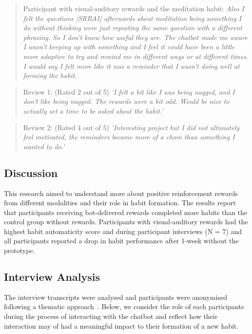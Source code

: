 \begin{quote}
Participant with visual-auditory rewards and the meditation habit: \textit{Also I felt the questions [SRBAI] afterwards about meditation being something I do without thinking were just repeating the same question with a different phrasing. So I don't know how useful they are. The chatbot made me aware I wasn't keeping up with something and I feel it could have been a little more adaptive to try and remind me in different ways or at different times. I would say I felt more like it was a reminder that I wasn't doing well at forming the habit.}
\end{quote}
\begin{quote}
Review 1: (Rated 2 out of 5) \textit{'I felt a bit like I was being nagged, and I don't like being nagged. The rewards were a bit odd. Would be nice to actually set a time to be asked about the habit.'}
\end{quote}
\begin{quote}
Review 2: (Rated 4 out of 5) \textit{'Interesting project but I did not ultimately feel motivated, the reminders became more of a chore than something I wanted to do.'}
\end{quote}

\subsection{Discussion}
This research aimed to understand more about positive reinforcement rewards from different modalities and their role in habit formation. The results report that participants receiving bot-delivered rewards completed more habits than the control group without rewards. Participants with visual-auditory rewards had the highest habit automaticity score and during participant interviews (N = 7) and all participants reported a drop in habit performance after 1-week without the prototype.

\subsection{Interview Analysis}
The interview transcripts were analysed and participants were anonymised following a thematic approach~\cite{thematic_analysis_qualatitive_data}. Below, we consider the role of each participants during the process of interacting with the chatbot and reflect how their interaction may of had a meaningful impact to their formation of a new habit.

